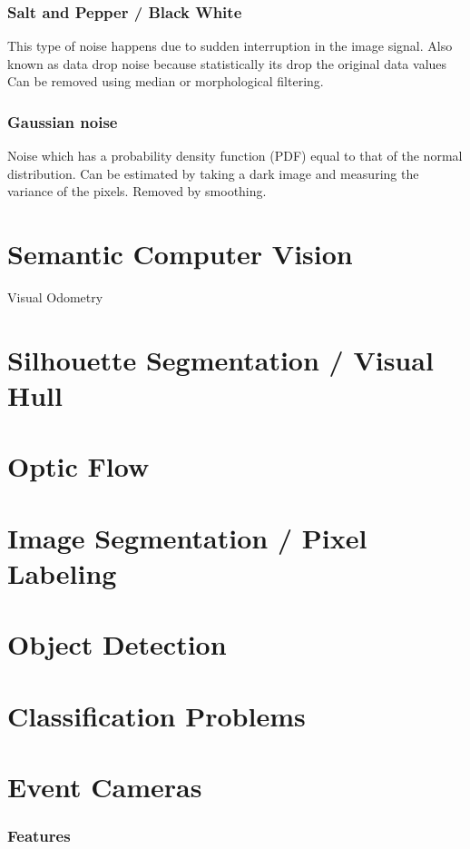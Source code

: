 \subsubsection{Salt and Pepper / Black White}
This type of noise happens due to sudden interruption in the image signal.
Also known as data drop noise because statistically its drop the original data values
Can be removed using median or morphological filtering.

\subsubsection{Gaussian noise}
Noise which has a probability density function (PDF) equal to that of the normal distribution.
Can be estimated by taking a dark image and measuring the variance of the pixels. Removed by smoothing.

\section{Semantic Computer Vision} 

Visual Odometry

\section{Silhouette Segmentation / Visual Hull}

\section{Optic Flow}

\section{Image Segmentation / Pixel Labeling}

\section{Object Detection}

\section{Classification Problems}

\section{Event Cameras}

\subsubsection{Features}

